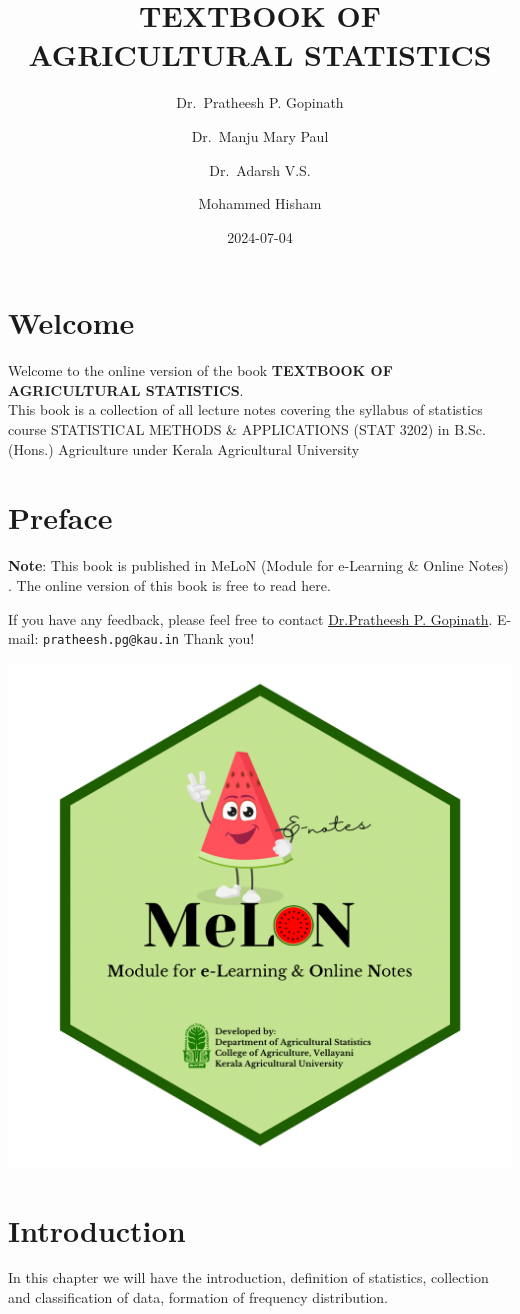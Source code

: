 \documentclass[
]{book}
\title{TEXTBOOK OF AGRICULTURAL STATISTICS}
\author{Dr.~Pratheesh P. Gopinath \and Dr.~Manju Mary Paul \and Dr.~Adarsh V.S. \and Mohammed Hisham}
\date{2024-07-04}
\begin{document}
\maketitle

{
\setcounter{tocdepth}{1}
\tableofcontents
}
\chapter*{Welcome}\label{welcome}

Welcome to the online version of the book \textbf{TEXTBOOK OF AGRICULTURAL STATISTICS}.\\

This book is a collection of all lecture notes covering the syllabus of statistics course STATISTICAL METHODS \& APPLICATIONS (STAT 3202) in B.Sc.(Hons.) Agriculture under Kerala Agricultural University

\chapter*{Preface}\label{preface}

\textbf{Note}: This book is published in MeLoN (Module for e-Learning \& Online Notes) . The online version of this book is free to read here.

If you have any feedback, please feel free to contact \href{https://coavellayani.kau.in/people/dr-pratheesh-p-gopinath}{Dr.Pratheesh P. Gopinath}. E-mail: \texttt{pratheesh.pg@kau.in} Thank you!

\begin{center}\includegraphics[width=0.3\linewidth]{images/logo} \end{center}

\chapter{Introduction}\label{introduction}

In this chapter we will have the introduction, definition of statistics, collection and classification of data, formation of frequency distribution.\citep{goon} \citep{gupta}
\end{document}
